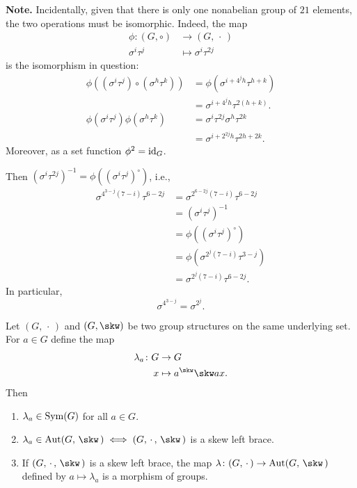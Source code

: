 \begin{xmpls}
\begin{enumerate}[\rm a)]
    \textbf{Note.} Incidentally, given that there is only one nonabelian group of $21$ elements, the two operations must be isomorphic. Indeed, the map
    \begin{align*}
        \phi\colon (G,\circ)&\to(G,\,\cdot\,)\\
            \sigma^i\tau^j&\mapsto\sigma^i\tau^{2j}
    \end{align*}
    is the isomorphism in question:
    \begin{align*}
        \phi((\sigma^i\tau^j)\circ(\sigma^h\tau^k))
            &= \phi(\sigma^{i+4^jh}\tau^{h+k})\\
            &= \sigma^{i+4^jh}\tau^{2(h+k)}.\\
        \phi(\sigma^i\tau^j)\phi(\sigma^h\tau^k)
            &=\sigma^i\tau^{2j}\sigma^h\tau^{2k}\\
            &= \sigma^{i+2^{2j}h}\tau^{2h+2k}.
    \end{align*}
    Moreover, as a set function $\phi^2=\operatorname{id}_G$.
    
    Then $(\sigma^i\tau^{2j})^{-1}=\phi((\sigma^i\tau^j)^\circ)$, i.e.,
    \begin{align*}
        \sigma^{4^{3-j}(7-i)}\tau^{6-2j}
            &= \sigma^{2^{6-2j}(7-i)}\tau^{6-2j}\\
            &= (\sigma^i\tau^j)^{-1}\\
            &= \phi((\sigma^i\tau^j)^\circ)\\
            &= \phi(\sigma^{2^j(7-i)}\tau^{3-j})\\
            &= \sigma^{2^j(7-i)}\tau^{6-2j}.
    \end{align*}
    In particular,
    \begin{equation}\label{eq:G21-equation}
        \sigma^{4^{3-j}}=\sigma^{2^j}.
    \end{equation}
\end{enumerate}
\end{xmpls}

\begin{lem}\label{lem:ybe-lambda}
    Let\/ $(G,\,\cdot\,)$ and\/ $(G,\skw)$ be two group structures on the same underlying set. For\/ $a\in G$ define the map
    \begin{align}\label{map:lambda}
        \lambda_a\colon G&\to G\\
        x&\mapsto a^\skw\skw ax.\nonumber
    \end{align}
    Then
    \begin{enumerate}[\rm a)]
        \item $\lambda_a\in{\rm Sym}(G)$ for all\/ $a\in G$.
        \item $\lambda_a\in\Aut(G,\,\skw\,)\iff (G,\,\cdot\,,\,\skw\,)$ is a skew left brace.
        \item If\/ $(G,\,\cdot\,,\,\skw\,)$ is a skew left brace, the map\/ $\lambda\colon(G,\,\cdot\,)\to\Aut(G,\,\skw\,)$ defined by\/ $a\mapsto\lambda_a$ is a morphism of groups.
    \end{enumerate}
\end{lem}

